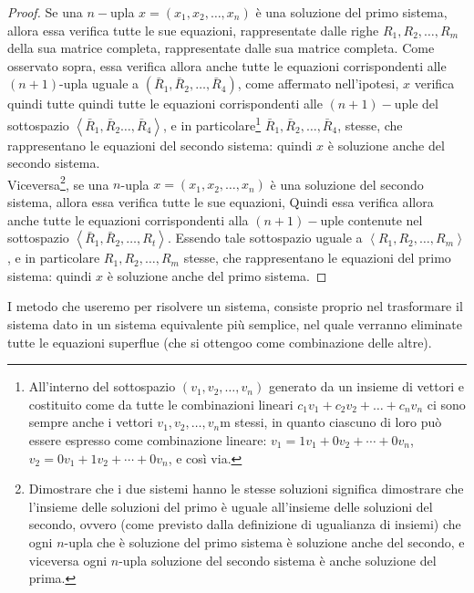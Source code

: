 \begin{proof}
  Se una $n-$upla $x=(x_1,x_2,\dots,x_n)$ è una soluzione del primo
  sistema, allora essa verifica tutte le sue equazioni, rappresentate
  dalle righe $R_1,R_2,\dots,R_m$ della sua matrice completa,
  rappresentate dalle sua matrice completa. Come osservato sopra, essa
  verifica allora anche tutte le equazioni corrispondenti alle
  $(n+1)$-upla uguale a $(\bar{R}_1,\bar{R}_2,\dots,\bar{R}_4)$, come
  affermato nell'ipotesi, $x$ verifica quindi tutte quindi tutte
  le equazioni corrispondenti alle $(n+1)-$uple del sottospazio
  $\left\langle \bar{R}_1,\bar{R}_2\dots,\bar{R}_4
\right\rangle$, e in
  particolare\footnote{All'interno del sottospazio $(v_1,v_2,\dots,v_n)$
    generato da un insieme di vettori e costituito come da tutte le
    combinazioni lineari $c_1v_1+c_2v_2+\dots+c_nv_n$ ci sono sempre
    anche i vettori $v_1,v_2,\dots,v_n$m stessi, in quanto ciascuno di
    loro può essere espresso come combinazione lineare:
    $v_1=1v_1+0v_2+\cdots+0v_n$, $v_2=0v_1+1v_2+\cdots+0v_n$, e così via.}
  $\bar{R}_1,\bar{R}_2,\dots,\bar{R}_4$, stesse, che rappresentano le
  equazioni del secondo sistema: quindi $x$ è soluzione anche del secondo
  sistema.\\
  Viceversa\footnote{Dimostrare che i due sistemi hanno le stesse
    soluzioni significa dimostrare che l'insieme delle soluzioni del
    primo è uguale all'insieme delle soluzioni del secondo, ovvero (come
    previsto dalla definizione di ugualianza di insiemi) che ogni
    $n$-upla che è soluzione del primo sistema è soluzione anche del
    secondo, e viceversa ogni $n$-upla soluzione del secondo sistema è
    anche soluzione del prima.}, se una $n$-upla $x=(x_1,x_2,\dots,x_n)$
  è una soluzione del secondo sistema, allora essa verifica tutte le sue
  equazioni, Quindi essa verifica allora anche tutte le equazioni
  corrispondenti alla $(n+1)-$uple contenute nel sottospazio $\left\langle
    \bar{R}_1,\bar{R}_2,\dots,R_t
  \right\rangle$. Essendo tale sottospazio uguale a $\left\langle
    R_1,R_2,\dots,R_m
  \right\rangle$, e in particolare $R_1,R_2,\dots,R_m$ stesse, che
  rappresentano le equazioni del primo sistema: quindi $x$ è soluzione
  anche del primo sistema.
\end{proof}
I metodo che useremo per risolvere un sistema, consiste proprio nel
trasformare il sistema dato in un sistema equivalente più semplice, nel
quale verranno eliminate tutte le equazioni superflue (che si ottengoo
come combinazione delle altre).


